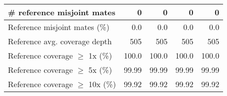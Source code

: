 \documentclass[12pt,a4paper]{article}
\begin{document}
\begin{table}[ht]
\begin{center}
\begin{tabular}{|l*{4}{|r}|}
\# reference misjoint mates & 0 & 0 & 0 & 0 \\ \hline
Reference misjoint mates (\%) & 0.0 & 0.0 & 0.0 & 0.0 \\ \hline
Reference avg. coverage depth & 505 & 505 & 505 & 505 \\ \hline
Reference coverage $\geq$ 1x (\%) & 100.0 & 100.0 & 100.0 & 100.0 \\ \hline
Reference coverage $\geq$ 5x (\%) & 99.99 & 99.99 & 99.99 & 99.99 \\ \hline
Reference coverage $\geq$ 10x (\%) & 99.92 & 99.92 & 99.92 & 99.92 \\ \hline
\end{tabular}
\end{center}
\end{table}
\end{document}
